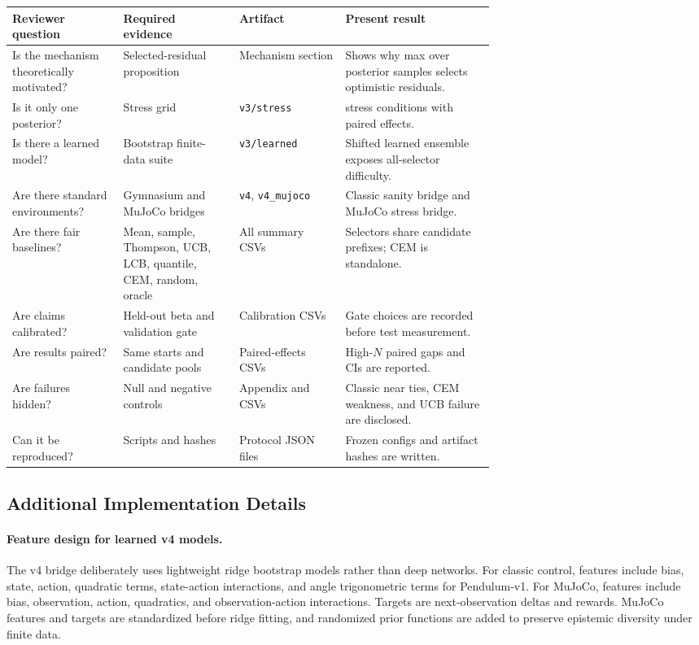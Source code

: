 \documentclass{article}
\begin{document}
\begin{center}
\small
\begin{tabularx}{\linewidth}{p{0.23\linewidth}p{0.24\linewidth}p{0.22\linewidth}X}
\toprule
Reviewer question & Required evidence & Artifact & Present result \\
\midrule
Is the mechanism theoretically motivated? &
Selected-residual proposition &
Mechanism section &
Shows why max over posterior samples selects optimistic residuals. \\
Is it only one posterior? &
Stress grid &
\texttt{v3/stress} &
\VThreeStressConditions{} stress conditions with paired effects. \\
Is there a learned model? &
Bootstrap finite-data suite &
\texttt{v3/learned} &
Shifted learned ensemble exposes all-selector difficulty. \\
Are there standard environments? &
Gymnasium and MuJoCo bridges &
\texttt{v4}, \texttt{v4\_mujoco} &
Classic sanity bridge and MuJoCo stress bridge. \\
Are there fair baselines? &
Mean, sample, Thompson, UCB, LCB, quantile, CEM, random, oracle &
All summary CSVs &
Selectors share candidate prefixes; CEM is standalone. \\
Are claims calibrated? &
Held-out beta and validation gate &
Calibration CSVs &
Gate choices are recorded before test measurement. \\
Are results paired? &
Same starts and candidate pools &
Paired-effects CSVs &
High-$N$ paired gaps and CIs are reported. \\
Are failures hidden? &
Null and negative controls &
Appendix and CSVs &
Classic near ties, CEM weakness, and UCB failure are disclosed. \\
Can it be reproduced? &
Scripts and hashes &
Protocol JSON files &
Frozen configs and artifact hashes are written. \\
\bottomrule
\end{tabularx}
\end{center}

\subsection{Additional Implementation Details}

\paragraph{Feature design for learned v4 models.}
The v4 bridge deliberately uses lightweight ridge bootstrap models rather than
deep networks. For classic control, features include bias, state, action,
quadratic terms, state-action interactions, and angle trigonometric terms for
Pendulum-v1. For MuJoCo, features include bias, observation, action,
quadratics, and observation-action interactions. Targets are next-observation
deltas and rewards. MuJoCo features and targets are standardized before ridge
fitting, and randomized prior functions are added to preserve epistemic
diversity under finite data.
\end{document}

